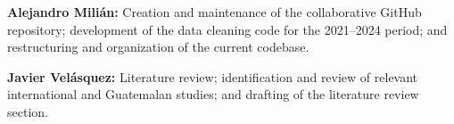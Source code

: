 \documentclass{article}
\begin{document}
\textbf{Alejandro Milián:} Creation and maintenance of the collaborative GitHub repository; development of the data cleaning code for the 2021--2024 period; and restructuring and organization of the current codebase.

\textbf{Javier Velásquez:} Literature review; identification and review of relevant international and Guatemalan studies; and drafting of the literature review section.

\clearpage
\printbibliography

\clearpage
\appendix
\setcounter{figure}{0}
\setcounter{table}{0}
\renewcommand{\thefigure}{A\arabic{figure}}
\renewcommand{\thetable}{A\arabic{table}}

\end{document}
